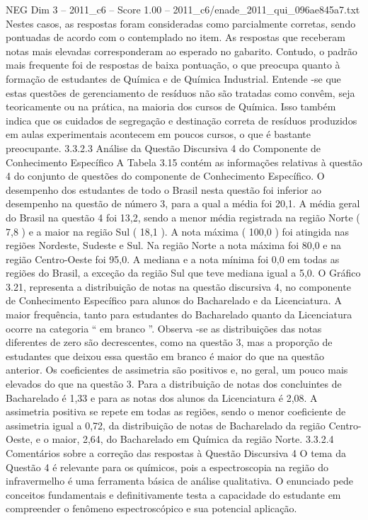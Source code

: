 \begin{textsample}{NEG Dim 3 – 2011\_c6 – Score 1.00 – 2011\_c6/enade\_2011\_qui\_096ae845a7.txt}
Nestes casos, as respostas foram consideradas como parcialmente corretas, sendo pontuadas de acordo com o contemplado no item.
As respostas que receberam notas mais elevadas corresponderam ao esperado no gabarito.
Contudo, o padrão mais frequente foi de respostas de baixa pontuação, o que preocupa quanto à formação de estudantes de Química e de Química Industrial.
Entende -se que estas questões de gerenciamento de resíduos não são tratadas como convêm, seja teoricamente ou na prática, na maioria dos cursos de Química.
Isso também indica que os cuidados de segregação e destinação correta de resíduos produzidos em aulas experimentais acontecem em poucos cursos, o que é bastante preocupante. 3.3.2.3 Análise da Questão Discursiva 4 do Componente de Conhecimento Específico A Tabela 3.15 contém as informações relativas à questão 4 do conjunto de questões do componente de Conhecimento Específico.
O desempenho dos estudantes de todo o Brasil nesta questão foi inferior ao desempenho na questão de número 3, para a qual a média foi 20,1.
A média geral do Brasil na questão 4 foi 13,2, sendo a menor média registrada na região Norte ( 7,8 ) e a maior na região Sul ( 18,1 ).
A nota máxima ( 100,0 ) foi atingida nas regiões Nordeste, Sudeste e Sul.
Na região Norte a nota máxima foi 80,0 e na região Centro-Oeste foi 95,0.
A mediana e a nota mínima foi 0,0 em todas as regiões do Brasil, a exceção da região Sul que teve mediana igual a 5,0.
O Gráfico 3.21, representa a distribuição de notas na questão discursiva 4, no componente de Conhecimento Específico para alunos do Bacharelado e da Licenciatura.
A maior frequência, tanto para estudantes do Bacharelado quanto da Licenciatura ocorre na categoria “ em branco ”.
Observa -se as distribuições das notas diferentes de zero são decrescentes, como na questão 3, mas a proporção de estudantes que deixou essa questão em branco é maior do que na questão anterior.
Os coeficientes de assimetria são positivos e, no geral, um pouco mais elevados do que na questão 3.
Para a distribuição de notas dos concluintes de Bacharelado é 1,33 e para as notas dos alunos da Licenciatura é 2,08.
A assimetria positiva se repete em todas as regiões, sendo o menor coeficiente de assimetria igual a 0,72, da distribuição de notas de Bacharelado da região Centro-Oeste, e o maior, 2,64, do Bacharelado em Química da região Norte. 3.3.2.4 Comentários sobre a correção das respostas à Questão Discursiva 4 O tema da Questão 4 é relevante para os químicos, pois a espectroscopia na região do infravermelho é uma ferramenta básica de análise qualitativa.
O enunciado pede conceitos fundamentais e definitivamente testa a capacidade do estudante em compreender o fenômeno espectroscópico e sua potencial aplicação.

\end{textsample}
